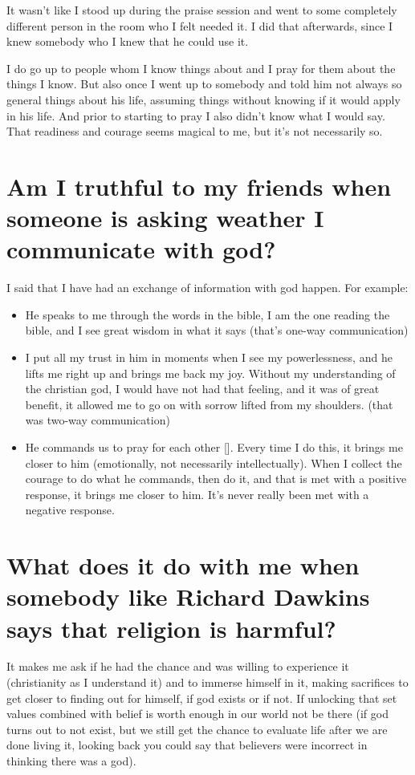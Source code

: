 \documentclass[11pt]{article}
\begin{document}
It wasn't like I stood up during the praise session and went to some completely different person in the room who I felt needed it. 
I did that afterwards, since I knew somebody who I knew that he could use it.

I do go up to people whom I know things about and I pray for them about the things I know. But also once I went up to somebody and told him not always so general things about his life, assuming things without knowing if it would apply in his life. And prior to starting to pray I also didn't know what I would say. That readiness and courage seems magical to me, but it's not necessarily so.

\section{Am I truthful to my friends when someone is asking weather I communicate with god?}
\label{sec:org701d262}
I said that I have had an exchange of information with god happen. For example: 

\begin{itemize}
\item He speaks to me through the words in the bible, I am the one reading the bible, and I see great wisdom in what it says (that's one-way communication)

\item I put all my trust in him in moments when I see my powerlessness, and he lifts me right up and brings me back my joy. Without my understanding of the christian god, I would have not had that feeling, and it was of great benefit, it allowed me to go on with sorrow lifted from my shoulders. (that was two-way communication)

\item He commands us to pray for each other []. Every time I do this, it brings me closer to him (emotionally, not necessarily intellectually). When I collect the courage to do what he commands, then do it, and that is met with a positive response, it brings me closer to him. It's never really been met with a negative response.
\end{itemize}

\section{What does it do with me when somebody like Richard Dawkins says that religion is harmful?}
\label{sec:orgf8ea9a4}
It makes me ask if he had the chance and was willing to experience it (christianity as I understand it) and to immerse himself in it, making sacrifices to get closer to finding out for himself, if god exists or if not. If unlocking that set values combined with belief is worth enough in our world not be there (if god turns out to not exist, but we still get the chance to evaluate life after we are done living it, looking back you could say that believers were incorrect in thinking there was a god). 
\end{document}
